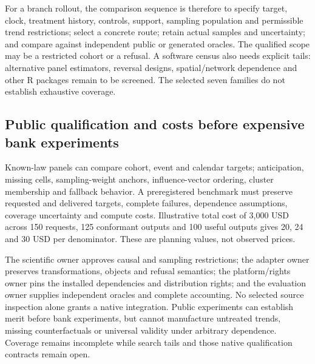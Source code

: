 For a branch rollout, the comparison sequence is therefore to specify target,
clock, treatment history, controls, support, sampling population and permissible
trend restrictions; select a concrete route; retain actual samples and
uncertainty; and compare against independent public or generated oracles.
The qualified scope may be a restricted cohort or a refusal. A software census
also needs explicit tails: alternative panel estimators, reversal designs,
spatial/network dependence and other R packages remain to be screened. The
selected seven families do not establish exhaustive coverage.
\citep{exec24_panelr_contract}

\subsection{Public qualification and costs before expensive bank experiments}
Known-law panels can compare cohort, event and calendar targets; anticipation,
missing cells, sampling-weight anchors, influence-vector ordering, cluster
membership and fallback behavior. A preregistered benchmark must preserve
requested and delivered targets, complete failures, dependence assumptions,
coverage uncertainty and compute costs. Illustrative total cost of 3,000 USD
across 150 requests, 125 conformant outputs and 100 useful outputs gives 20,
24 and 30 USD per denominator. These are planning values, not observed prices.
\citep{exec24_panelr_contract}

The scientific owner approves causal and sampling restrictions; the adapter
owner preserves transformations, objects and refusal semantics; the
platform/rights owner pins the installed dependencies and distribution rights;
and the evaluation owner supplies independent oracles and complete accounting.
No selected source inspection alone grants a native integration. Public
experiments can establish merit before bank experiments, but cannot manufacture
untreated trends, missing counterfactuals or universal validity under arbitrary
dependence. Coverage remains incomplete while search tails and those native
qualification contracts remain open.
\citep{exec24_panelr_contract}
